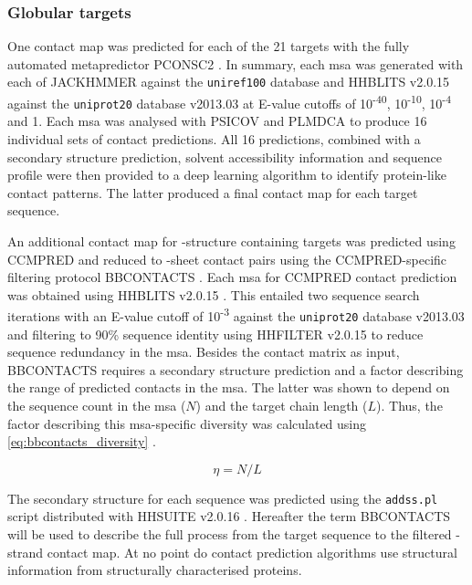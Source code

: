 \subsubsection{Globular targets}
One contact map was predicted for each of the 21 targets with the fully automated metapredictor PCONSC2 \cite{Skwark2014-qp}. In summary, each \gls{msa} was generated with each of JACKHMMER  \cite{Johnson2010-uz} against the \texttt{uniref100} database and HHBLITS v2.0.15 \cite{Remmert2011-kt} against the \texttt{uniprot20} database v2013.03 \cite{Bateman2017-pb} at E-value cutoffs of 10\textsuperscript{-40}, 10\textsuperscript{-10}, 10\textsuperscript{-4} and 1. Each \gls{msa} was analysed with PSICOV \cite{Jones2012-ks} and PLMDCA \cite{Ekeberg2014-kf} to produce 16 individual sets of contact predictions. All 16 predictions, combined with a secondary structure prediction, solvent accessibility information and sequence profile were then provided to a deep learning algorithm \cite{Skwark2014-qp} to identify protein-like contact patterns. The latter produced a final contact map for each target sequence. 

An additional contact map for \textbeta-structure containing targets was predicted using CCMPRED \cite{Seemayer2014-zp} and reduced to \textbeta-sheet contact pairs using the CCMPRED-specific filtering protocol BBCONTACTS \cite{Andreani2015-qn}. Each \gls{msa} for CCMPRED contact prediction was obtained using HHBLITS v2.0.15 \cite{Remmert2011-kt}. This entailed two sequence search iterations with an E-value cutoff of 10\textsuperscript{-3} against the \texttt{uniprot20} database v2013.03 \cite{Bateman2017-pb} and filtering to 90\% sequence identity using HHFILTER v2.0.15 \cite{Remmert2011-kt} to reduce sequence redundancy in the \gls{msa}. Besides the contact matrix as input, BBCONTACTS requires a secondary structure prediction and a factor describing the range of predicted contacts in the \gls{msa}. The latter was shown to depend on the sequence count in the \gls{msa} ($N$) and the target chain length ($L$). Thus, the factor describing this \gls{msa}-specific diversity was calculated using \cref{eq:bbcontacts_diversity} \cite{Andreani2015-qn}. 

\begin{equation}
    \eta=N/L 
    \label{eq:bbcontacts_diversity}
\end{equation}

The secondary structure for each sequence was predicted using the \texttt{addss.pl} \cite{Remmert2011-kt} script distributed with HHSUITE v2.0.16 \cite{Soding2005-hw}. Hereafter the term BBCONTACTS will be used to describe the full process from the target sequence to the filtered \textbeta-strand contact map. At no point do contact prediction algorithms use structural information from structurally characterised proteins.

